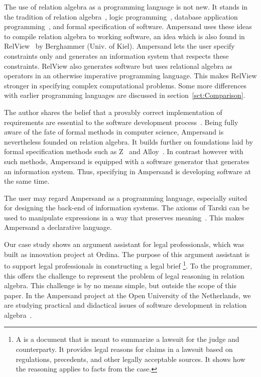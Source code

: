 \documentclass{elsarticle}
\begin{document}
	The use of relation algebra as a programming language is not new.
	It stands in the tradition of relation algebra~\cite{Maddux06}, logic programming~\cite{Lloyd1984},
	database application programming~\cite{Codd70}, and formal specification of software.
	Ampersand uses these ideas to compile relation algebra to working software, an idea which is also found in RelView~\cite{Berghammer2005} by Berghammer (Univ. of Kiel).
 	Ampersand lets the user specify constraints only and generates an information system that respects these constraints.
	RelView also generates software but uses relational algebra as operators in an otherwise imperative programming language.
	This makes RelView stronger in specifying complex computational problems.
	Some more differences with earlier programming languages are discussed in section~\ref{sct:Comparison}.

	The author shares the belief that a provably correct implementation of requirements are essential to the software development process~\cite{Boehm1981}.
	Being fully aware of the fate of formal methods in computer science,
        Ampersand is nevertheless founded on relation algebra.
	It builds further on foundations laid by formal specification methods
	such as Z~\cite{Z} and Alloy~\cite{Alloy2006}.
	In contrast however with such methods, Ampersand is equipped with a software generator that generates an information system.
	Thus, specifying in Ampersand is developing software at the same time.

	The user may regard Ampersand as a programming language, especially suited for designing the back-end of information systems.
	The axioms of Tarski can be used to manipulate expressions in a way that preserves meaning~\cite{vdWoude2011}.
	This makes Ampersand a declarative language.

	Our case study shows an argument assistant for legal professionals, which was built as innovation project at Ordina.
	The purpose of this argument assistant is to support legal professionals in constructing a legal brief%
\footnote{A  is a document that is meant to summarize a lawsuit for the judge and counterparty.
	It provides legal reasons for claims in a lawsuit based on regulations, precedents, and other legally acceptable sources.
	It shows how the reasoning applies to facts from the case.}.
	To the programmer, this offers the challenge to represent the problem of legal reasoning in relation algebra.
	This challenge is by no means simple, but outside the scope of this paper.
	In the Ampersand project at the Open University of the Netherlands,
	we are studying practical and didactical issues of software development in relation algebra~\cite{Michels2015}.
\end{document}
